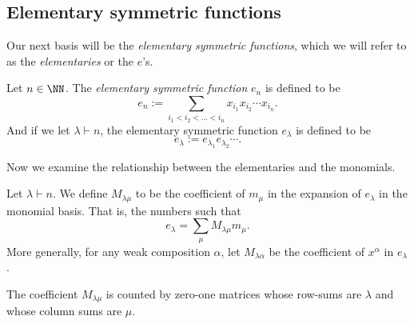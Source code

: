 \documentclass{article}
\begin{document}
\subsection{Elementary symmetric functions}

Our next basis will be the \textit{elementary symmetric functions}, which we will refer to as the \textit{elementaries} or the $e$'s.

\begin{definition}
    Let $n\in\NN$. The \textit{elementary symmetric function} $e_n$ is defined to be
    \[
        e_n := \sum_{i_1<i_2<\ldots<i_n} x_{i_1}x_{i_2}\cdots x_{i_n}.
    \]
    And if we let $\lambda \vdash n$, the elementary symmetric function $e_\lambda$ is defined to be
    \[
        e_\lambda := e_{\lambda_1}e_{\lambda_2}\cdots.
    \]
\end{definition}

Now we examine the relationship between the elementaries and the monomials.

\begin{definition}
    Let $\lambda \vdash n$. We define $M_{\lambda\mu}$ to be the coefficient of $m_\mu$ in the expansion of $e_\lambda$ in the monomial basis. That is, the numbers such that
    \[
        e_\lambda = \sum_\mu M_{\lambda\mu} m_\mu.
    \]
    More generally, for any weak composition $\alpha$, let $M_{\lambda\alpha}$ be the coefficient of $x^\alpha$ in $e_\lambda$.
\end{definition}

\begin{theorem} \label{thm:e2mCombInterpretation}
    The coefficient $M_{\lambda\mu}$ is counted by zero-one matrices whose row-sums are $\lambda$ and whose column sums are $\mu$.
\end{theorem}
\end{document}
